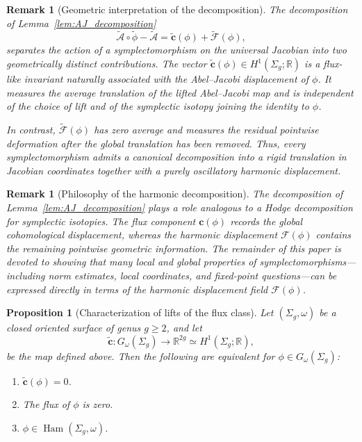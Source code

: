 \documentclass[11pt]{article}
\newtheorem{proposition}[theorem]{Proposition}
\newtheorem{remark}[theorem]{Remark}
\theoremstyle{definition}
\newcommand{\Ham}{\operatorname{Ham}}
\begin{document}
	\begin{remark}[Geometric interpretation of the decomposition]
		The decomposition of Lemma~\ref{lem:AJ_decomposition}
		\[
		\widetilde{\mathcal A}\circ\widetilde\phi
		-
		\widetilde{\mathcal A}
		=
		\widetilde{\mathbf c}(\phi)
		+
		\widetilde{\mathcal F}(\phi),
		\]
		separates the action of a symplectomorphism on the universal Jacobian into two
		geometrically distinct contributions. The vector $\widetilde{\mathbf c}(\phi)\in
		H^1(\Sigma_g;\mathbb R)$ is a flux-like invariant naturally associated with the
		Abel--Jacobi displacement of $\phi$. It measures the average translation of the
		lifted Abel--Jacobi map and is independent of the choice of lift and of the
		symplectic isotopy joining the identity to $\phi$.
		
		In contrast, $\widetilde{\mathcal F}(\phi)$ has zero average and measures the
		residual pointwise deformation after the global translation has been removed.
		Thus, every symplectomorphism admits a canonical decomposition into a rigid
		translation in Jacobian coordinates together with a purely oscillatory harmonic
		displacement.
	\end{remark}
	
	\begin{remark}[Philosophy of the harmonic decomposition]
		The decomposition of Lemma~\ref{lem:AJ_decomposition} plays a role analogous to
		a Hodge decomposition for symplectic isotopies. The flux component $\mathbf
		c(\phi)$ records the global cohomological displacement, whereas the harmonic
		displacement $\mathcal F(\phi)$ contains the remaining pointwise geometric
		information. The remainder of this paper is devoted to showing that many local
		and global properties of symplectomorphisms---including norm estimates, local
		coordinates, and fixed-point questions---can be expressed directly in terms of
		the harmonic displacement field $\mathcal F(\phi)$.
	\end{remark}
	
	\begin{proposition}[Characterization of lifts of the flux class]
		\label{prop:lift_characterization}
		Let $(\Sigma_g,\omega)$ be a closed oriented surface of genus $g\ge2$, and let
		\[
		\widetilde{\mathbf c}:G_\omega(\Sigma_g)\longrightarrow
		\mathbb R^{2g}
		\simeq H^1(\Sigma_g;\mathbb R),
		\]
		be the map defined above. Then the following are equivalent for $\phi\in
		G_\omega(\Sigma_g)$:
		
		\begin{enumerate}
			\item[(i)] $\widetilde{\mathbf c}(\phi)=0$.
			
			\item[(ii)] The flux of $\phi$ is zero.
			
			\item[(iii)] $\phi\in\Ham(\Sigma_g,\omega)$.
		\end{enumerate}
	\end{proposition}
	
\end{document}
